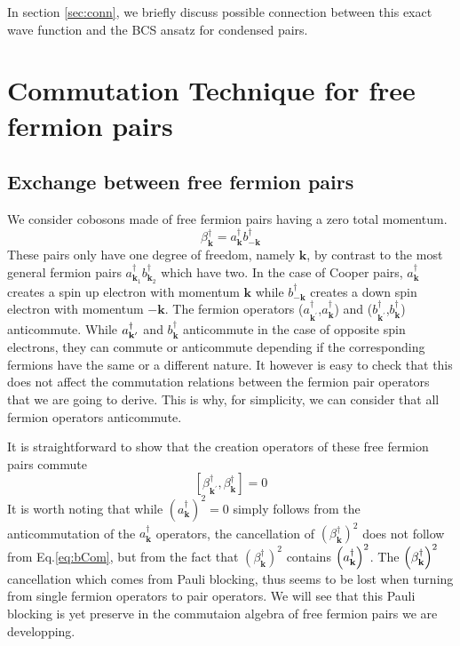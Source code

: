 \documentclass[aps,prb,superscriptaddress,twocolumn]{revtex4}
\newcommand{\vk}{\ensuremath{\mathbf{k}}}
\begin{document}
In section \ref{sec:conn}, we briefly discuss possible connection between this exact
wave function and the BCS ansatz for condensed pairs.

\section{Commutation Technique for free fermion pairs\label{sec:beta}}

\subsection{Exchange between free fermion pairs}

We consider cobosons made of free fermion pairs having a zero total
momentum. 
\begin{equation}
\beta^{\dagger}_\vk=a^{\dagger}_{\mathbf{k} }b^{\dagger}_{-\mathbf{k} }
\end{equation}
These pairs only have one degree of freedom, namely $\mathbf{k}$, by contrast to the
most general fermion pairs $a^{\dagger}_{\mathbf{k} _1}b^{\dagger}_{\mathbf{k%
} _2}$ which have two. In the case of Cooper pairs, $a^{\dagger}_{\mathbf{k} }$ creates a spin up electron with momentum $\mathbf{k}$ while $b^{\dagger}_{\mathbf{-k} }$ creates a down spin electron with momentum $\mathbf{-k}$. The fermion operators ($a^{\dagger}_{\mathbf{k}
^{\prime}}$,$a^{\dagger}_{\mathbf{k} }$) and ($b^{\dagger}_{\mathbf{k}
^{\prime}}$,$b^{\dagger}_{\mathbf{k} }$) anticommute. While $a^{\dagger}_{%
\mathbf{k} ^{\prime}}$ and $b^{\dagger}_{\mathbf{k} }$
anticommute in the case of opposite spin electrons, they can commute or anticommute depending if the corresponding fermions have the same or a different
nature. It however is easy to check that this does not affect the commutation
relations between the fermion pair operators that we are going to derive. This is why, for simplicity, we can consider that all fermion operators anticommute. 

It is straightforward to show that the creation operators of these free fermion pairs commute 
\begin{equation}  \label{eq:bCom}
\left[\beta^{\dagger}_{\mathbf{k} ^{\prime}},\beta^{\dagger}_{\mathbf{k} }%
\right]  =0
\end{equation}
It is worth noting that while $\left(a^{\dagger}_{\mathbf{k} }\right) ^2=0$
simply follows from the anticommutation of the $a^{\dagger}_{\mathbf{k} }$
operators, the cancellation of $\left(\beta^{\dagger}_{\mathbf{k} }\right) ^2
$ does not follow from Eq.\eqref{eq:bCom}, but from the fact that $%
\left(\beta^{\dagger}_{\mathbf{k} }\right) ^2$ contains $\left(a^{\dagger}_{%
\mathbf{k} {}}\right) ^2$. The $\left(\beta^{\dagger}_{%
\mathbf{k} }\right) ^2$ cancellation which comes from Pauli blocking, thus seems to be lost
when turning from single fermion operators to pair operators. We will see that this Pauli blocking is yet preserve in the commutaion algebra of
free fermion pairs we are developping.
\end{document}
